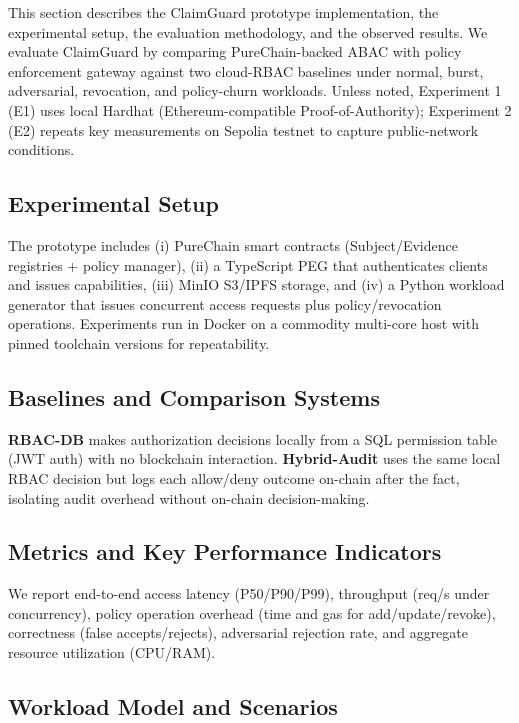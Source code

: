 \documentclass[final,5p,times,twocolumn]{elsarticle}
\begin{document}
This section describes the ClaimGuard prototype implementation, the experimental setup, the evaluation methodology, and the observed results. We evaluate ClaimGuard by comparing PureChain-backed ABAC with policy enforcement gateway against two cloud-RBAC baselines under normal, burst, adversarial, revocation, and policy-churn workloads. Unless noted, Experiment 1 (E1) uses local Hardhat (Ethereum-compatible Proof-of-Authority); Experiment 2 (E2) repeats key measurements on Sepolia testnet to capture public-network conditions.

\subsection{Experimental Setup}

The prototype includes (i) PureChain smart contracts (Subject/Evidence registries + policy manager), (ii) a TypeScript PEG that authenticates clients and issues capabilities, (iii) MinIO S3/IPFS storage, and (iv) a Python workload generator that issues concurrent access requests plus policy/revocation operations. Experiments run in Docker on a commodity multi-core host with pinned toolchain versions for repeatability.

\subsection{Baselines and Comparison Systems}


\textbf{RBAC-DB} makes authorization decisions locally from a SQL permission table (JWT auth) with no blockchain interaction. \textbf{Hybrid-Audit} uses the same local RBAC decision but logs each allow/deny outcome on-chain after the fact, isolating audit overhead without on-chain decision-making.

\subsection{Metrics and Key Performance Indicators}

We report end-to-end access latency (P50/P90/P99), throughput (req/s under concurrency), policy operation overhead (time and gas for add/update/revoke), correctness (false accepts/rejects), adversarial rejection rate, and aggregate resource utilization (CPU/RAM).

\subsection{Workload Model and Scenarios}
\end{document}
